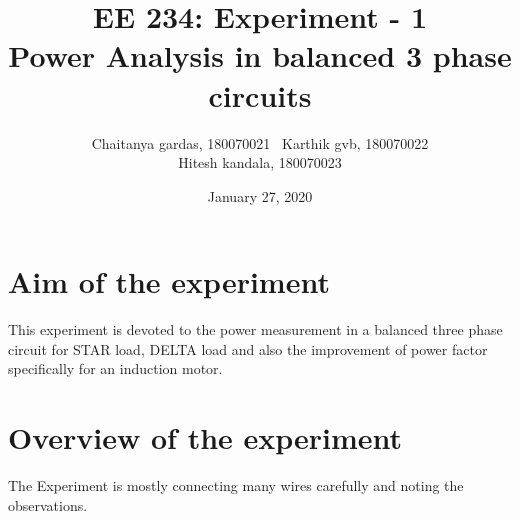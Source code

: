 \documentclass[12pt]{article}
\title{EE 234: Experiment - 1 \\
       Power Analysis in balanced 3 phase circuits}
\author{Chaitanya gardas, 180070021  \
Karthik gvb, 180070022 \\
Hitesh kandala, 180070023}
\date{January 27, 2020}
\begin{document}
  \maketitle
  
  \section{Aim of the experiment}
  
  This experiment is devoted to the power measurement in a balanced three phase circuit for STAR load, DELTA load and also the improvement of power factor specifically for an induction motor.
  
  
  \section{Overview of the experiment}
  The Experiment is mostly connecting many wires carefully and noting the observations. 
\end{document}
